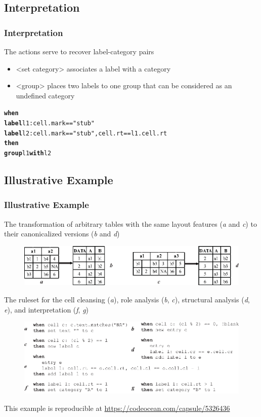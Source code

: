 \documentclass{beamer}
\begin{document}
\subsection{Interpretation}

\begin{frame}[fragile]
\frametitle{Interpretation}
The actions serve to recover label-category pairs
\begin{itemize}
	\item \alert{<set category>} associates a label with a category
	\item \alert{<group>} places two labels to one group that can be considered as an undefined category
\end{itemize}

\footnotesize{
\begin{example}
\begin{alltt}
\textbf{when}
  \textbf{label} l1: cell.mark == "stub"
  \textbf{label} l2: cell.mark == "stub", cell.rt == l1.cell.rt
\textbf{then}
  \textbf{group} l1 \textbf{with} l2
\end{alltt}
\end{example}
}

\end{frame}

\subsection{Illustrative Example}

\begin{frame}
\frametitle{Illustrative Example}

\scriptsize{The transformation of arbitrary tables with the same layout features (\textit{a} and \textit{c}) to their canonicalized versions (\textit{b} and \textit{d})}
\begin{figure}
\includegraphics[width=0.7\linewidth]{illustrative_example}
\end{figure}

\scriptsize{The ruleset for the cell cleansing (\textit{a}), role analysis (\textit{b}, \textit{c}), structural analysis (\textit{d}, \textit{e}), and interpretation (\textit{f}, \textit{g})}
\begin{figure}
\includegraphics[width=0.75\linewidth]{illustrative_example_rules}
\end{figure}

\tiny{This example is reproducible at \url{https://codeocean.com/capsule/5326436}}

\end{frame}
\end{document}
